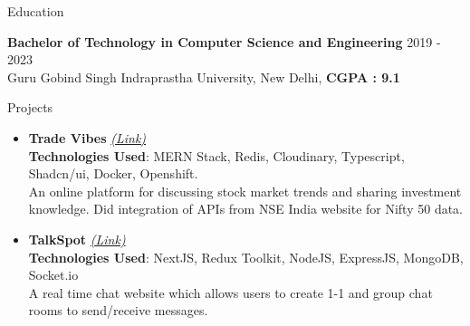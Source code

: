 \documentclass{resume} %
\begin{document}

\begin{rSection}{Education}

{\bf Bachelor of Technology in Computer Science and Engineering} \hfill {2019 - 2023}
\\ 
{\normalfont Guru Gobind Singh Indraprastha University, New Delhi}, \textbf{CGPA : 9.1}

\end{rSection}
 


\begin{rSection}{Projects}
   \begin{itemize}
    \item \textbf{Trade Vibes} 
    \href{https://github.com/tushargahlaut/TradeVibes}
    {\emph{(Link)}}
    \\ \textbf{Technologies Used}: MERN Stack, Redis, Cloudinary, Typescript, Shadcn/ui, Docker, Openshift.
     \\An online platform for discussing stock market trends and sharing investment knowledge. Did integration of APIs from NSE India website for Nifty 50 data.
    \item \textbf{TalkSpot} 
   \href{https://github.com/tushargahlaut/talkspot-chat-app}{\emph{(Link)}} 
   \\ \textbf{Technologies Used}: NextJS, Redux Toolkit, NodeJS, ExpressJS, MongoDB, Socket.io 
   \\{\normalfont A real time chat website which allows users to create 1-1 and group chat rooms to send/receive messages.}
   
   \end{itemize}
\end{rSection}
\end{document}
